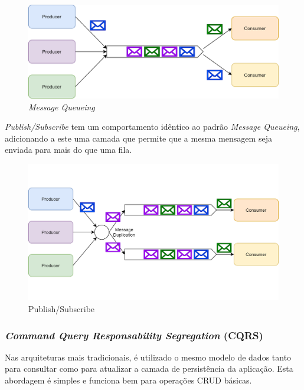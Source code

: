 \begin{figure}[H]
    \begin{center}
    \includegraphics[width=1\textwidth]{figures/message_queueing.png}
    \caption{\emph{Message Queueing}}
    \end{center}
\end{figure}

\emph{Publish/Subscribe} \label{publish_subscribe} tem um comportamento idêntico ao padrão \emph{Message Queueing}, adicionando a este uma camada que permite que a mesma mensagem seja enviada para mais do que uma fila.

\begin{figure}[H]
    \begin{center}
    \includegraphics[width=1\textwidth]{figures/pub_sub.png}
    \caption{Publish/Subscribe}
    \end{center}
\end{figure}

\subsubsection{\emph{Command Query Responsability Segregation} (CQRS)} \label{cqrs}
Nas arquiteturas mais tradicionais, é utilizado o mesmo modelo de dados tanto para consultar como para atualizar a camada de persistência da aplicação. Esta abordagem é simples e funciona bem para operações CRUD básicas.

